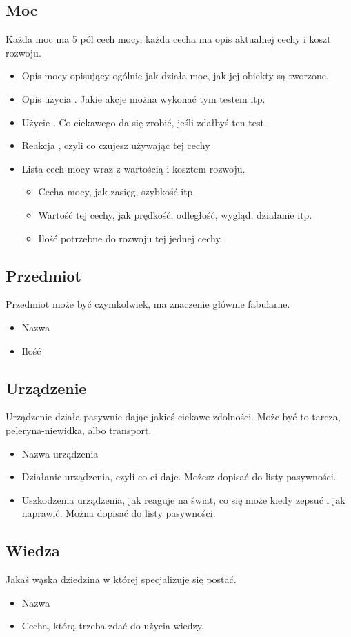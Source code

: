 \subsection{Moc}
Każda moc ma 5 pól cech mocy, każda cecha ma opis aktualnej cechy i koszt rozwoju.
\begin{itemize}
\item Opis mocy opisujący ogólnie jak działa moc, jak jej obiekty są tworzone.
\item Opis użycia \absm. Jakie akcje można wykonać tym testem itp.
\item Użycie \abdm. Co ciekawego da się zrobić, jeśli zdałbyś ten test.
\item Reakcja \abrm, czyli co czujesz używając tej cechy
\item Lista cech mocy wraz z wartością i kosztem rozwoju.
\begin{itemize}
 \item Cecha mocy, jak zasięg, szybkość itp.
 \item Wartość tej cechy, jak prędkość, odległość, wygląd, działanie itp.
 \item Ilość \xpmcn potrzebne do rozwoju tej jednej cechy.
\end{itemize}
\end{itemize}

\subsection{Przedmiot}
Przedmiot może być czymkolwiek, ma znaczenie głównie fabularne.
\begin{itemize}
 \item Nazwa
 \item Ilość
\end{itemize}

\subsection{Urządzenie}
Urządzenie działa pasywnie dając jakieś ciekawe zdolności.
Może być to tarcza, peleryna-niewidka, albo transport.
\begin{itemize}
\item Nazwa urządzenia
\item Działanie urządzenia, czyli co ci daje. Możesz dopisać do listy pasywności.
\item Uszkodzenia urządzenia, jak reaguje na świat, co się może kiedy zepsuć i jak naprawić. Można dopisać do listy pasywności.
\end{itemize}

\subsection{Wiedza}
Jakaś wąska dziedzina w której specjalizuje się postać.
\begin{itemize}
 \item Nazwa
 \item Cecha, którą trzeba zdać do użycia wiedzy.
\end{itemize}







